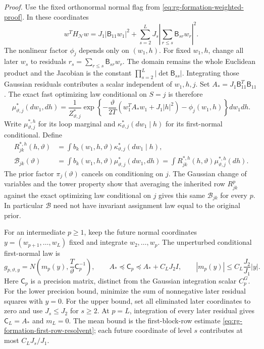 \emph{Proof.}
Use the fixed orthonormal normal flag from
\cref{eq:rg-formation-weighted-proof}. In these coordinates
\begin{equation}
 w^TH_{\mathcal N}w
 =J_1|\mathsf B_{11}w_1|^2
       +\sum_{s=2}^LJ_s
             \left|\sum_{r\le s}\mathsf B_{sr}w_r\right|^2.
 \label{eq:rg-formation-triangular-fast-quadratic}
\end{equation}
The nonlinear factor $\phi_j$ depends only on $(w_1,h)$.
For fixed $w_1,h$, change all later $w_s$ to residuals
$r_s=\sum_{r\le s}\mathsf B_{sr}w_r$.
The domain remains the whole Euclidean product and the Jacobian is
the constant $\prod_{s=2}^L|\det\mathsf B_{ss}|$.
Integrating those Gaussian residuals contributes a scalar independent
of $w_1,h,j$. Set $A_*=J_1\mathsf B_{11}^T\mathsf B_{11}$.
The exact fast optimizing law conditional on $S=j$ is therefore
\begin{equation}
 \mu_{\vartheta,j}^*(dw_1,dh)
 =\frac{1}{Z_{\vartheta,j}^*}
   \exp\left\{-\frac{\vartheta}{2T}
         (w_1^TA_*w_1+J_1|h|^2)-\phi_j(w_1,h)\right\}dw_1dh.
 \label{eq:rg-formation-fast-law}
\end{equation}
Write $\mu_{\vartheta,j}^{*,h}$ for its loop marginal and
$\kappa_{\vartheta,j}^*(dw_1\mid h)$ for its first-normal
conditional. Define
\begin{align}
 R_{jk}^{*,h}(h,\vartheta)
 &=\int b_k(w_1,h,\vartheta)
                   \kappa_{\vartheta,j}^*(dw_1\mid h),
 \label{eq:rg-formation-fast-loop-row}\\
 \mathcal B_{jk}(\vartheta)
 &=\int b_k(w_1,h,\vartheta)\mu_{\vartheta,j}^*(dw_1,dh)
   =\int R_{jk}^{*,h}(h,\vartheta)
                    \mu_{\vartheta,j}^{*,h}(dh).
 \label{eq:rg-formation-common-averaged-row}
\end{align}
The prior factor $\pi_j(\vartheta)$ cancels on conditioning on $j$.
The Gaussian change of variables and the tower property show that
averaging the inherited row $R_{jk}^p$ against the exact optimizing
law conditional on $j$ gives this same $\mathcal B_{jk}$ for every
$p$. In particular $\mathcal B$ need not have invariant assignment
law equal to the original prior.

For an intermediate $p\ge1$, keep the future normal coordinates
$y=(w_{p+1},\ldots,w_L)$ fixed and integrate $w_2,\ldots,w_p$.
The unperturbed conditional first-normal law is
\begin{equation}
 g_{p,\vartheta,y}
 =N\left(m_p(y),\frac T\vartheta\mathsf C_p^{-1}\right),\qquad
 A_*\preceq\mathsf C_p\preceq A_*+C_LJ_2I,\qquad
 |m_p(y)|\le C_L\frac{J_2}{J_1}|y|.
 \label{eq:rg-formation-first-normal-conditional}
\end{equation}
Here $\mathsf C_p$ is a precision matrix, distinct from the Gaussian
integration scalar $C_p^G$.
For the lower precision bound, minimize the sum of nonnegative
later residual squares with $y=0$. For the upper bound, set all
eliminated later coordinates to zero and use
$J_s\le J_2$ for $s\ge2$. At $p=L$, integration of every later
residual gives $\mathsf C_L=A_*$ and $m_L=0$.
The mean bound is the first-block-row estimate
\cref{eq:rg-formation-first-row-resolvent}; each future coordinate
of level $s$ contributes at most $C_LJ_s/J_1$.

